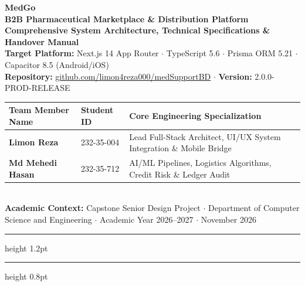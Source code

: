 \documentclass[10pt,a4paper]{article}
\begin{document}
\begin{center}
    {\Huge \textbf{\textcolor{MedEmerald}{MedGo}}}\\[0.3em]
    {\Large \textbf{B2B Pharmaceutical Marketplace \& Distribution Platform}}\\[0.6em]
    {\large \textbf{Comprehensive System Architecture, Technical Specifications \& Handover Manual}}\\[1.0em]
    
    \textbf{Target Platform:} Next.js 14 App Router $\cdot$ TypeScript 5.6 $\cdot$ Prisma ORM 5.21 $\cdot$ Capacitor 8.5 (Android/iOS) \\[0.3em]
    \textbf{Repository:} \href{https://github.com/limon4reza000/medSupportBD}{github.com/limon4reza000/medSupportBD} \quad $\cdot$ \quad \textbf{Version:} 2.0.0-PROD-RELEASE \\[1.0em]

    \begin{tabularx}{\textwidth}{p{4.2cm}p{3.0cm}X}
        \toprule
        \textbf{Team Member Name} & \textbf{Student ID} & \textbf{Core Engineering Specialization} \\
        \midrule
        \textbf{Limon Reza} & 232-35-004 & Lead Full-Stack Architect, UI/UX System Integration \& Mobile Bridge \\
        \textbf{Md Mehedi Hasan} & 232-35-712 & AI/ML Pipelines, Logistics Algorithms, Credit Risk \& Ledger Audit \\
        \bottomrule
    \end{tabularx}
    \\[0.6em]
    \textbf{Academic Context:} Capstone Senior Design Project $\cdot$ Department of Computer Science and Engineering $\cdot$ Academic Year 2026--2027 $\cdot$ November 2026
\end{center}

\vspace{0.3em}
\hrule height 1.2pt
\vspace{0.8em}

\tableofcontents

\vspace{1.0em}
\hrule height 0.8pt
\vspace{1.0em}

\end{document}
